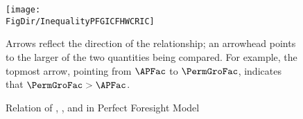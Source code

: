 \begin{figure}[ht]
  \label{fig:InequalityPFGICFHWCRIC}
  \centerline{
    \texttt{[image: \\FigDir/InequalityPFGICFHWCRIC]}
  }
  \caption{Relation of {\RIC}, {\GICRaw}, and {\FHWC} in Perfect Foresight Model}
  \footnotesize{Arrows reflect the direction of the relationship; an arrowhead points to the larger of the two quantities being compared.  For example, the topmost arrow, pointing from $\APFac$ to $\PermGroFac$, indicates that $\PermGroFac > \APFac$.}
\end{figure}

